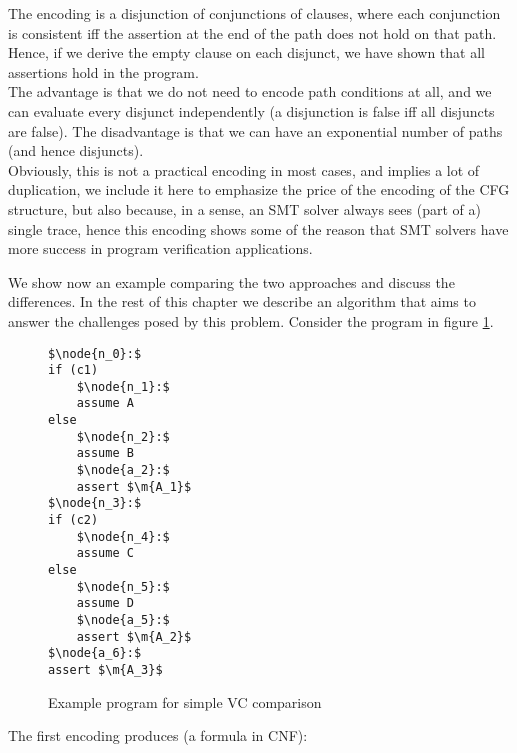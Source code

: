 \begin{itemize}
	\bigskip
	
		\noindent

	\bigskip

		\noindent
		The encoding is a disjunction of conjunctions of clauses, where each conjunction is consistent iff the assertion at the end of the path does not hold on that path. Hence, if we derive the empty clause on each disjunct, we have shown that all assertions hold in the program.\\
		The advantage is that we do not need to encode path conditions at all, and we can evaluate every disjunct independently (a disjunction is false iff all disjuncts are false).
		The disadvantage is that we can have an exponential number of paths (and hence disjuncts).\\
		Obviously, this is not a practical encoding in most cases, and implies a lot of duplication, 
		we include it here to emphasize the price of the encoding of the CFG structure, but also because, in a sense, 
		an SMT solver always sees (part of a) single trace, hence this encoding shows some of the reason that SMT solvers have more success in program verification applications.
\end{itemize}

We show now an example comparing the two approaches and discuss the differences. In the rest of this chapter we describe an algorithm that aims to answer the challenges posed by this problem. Consider the program in figure \ref{snippet4.1.1}.

\begin{figure}
\begin{lstlisting}
$\node{n_0}:$
if (c1)
	$\node{n_1}:$
	assume A
else	
	$\node{n_2}:$
	assume B
	$\node{a_2}:$
	assert $\m{A_1}$
$\node{n_3}:$
if (c2)
	$\node{n_4}:$
	assume C
else	
	$\node{n_5}:$
	assume D
	$\node{a_5}:$
	assert $\m{A_2}$
$\node{a_6}:$
assert $\m{A_3}$
\end{lstlisting}
\caption{Example program for simple VC comparison}
\label{snippet4.1.1}
\end{figure}


The first encoding produces (a formula in CNF):\\
\\
\\
\\
\\
\\
\\
\\
\\
\\
\\
\\
\\
\\

